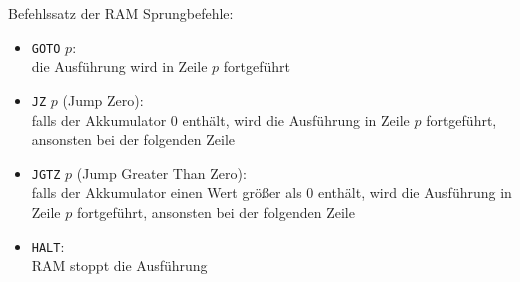 \documentclass[german]{../spicker}
\begin{document}
\begin{defi}{Befehlssatz der RAM}
  Sprungbefehle:
  \begin{itemize}
    \item \texttt{GOTO} $p$: \\
          die Ausführung wird in Zeile $p$ fortgeführt
    \item \texttt{JZ} $p$ (Jump Zero): \\
          falls der Akkumulator 0 enthält, wird die Ausführung in Zeile $p$ fortgeführt, ansonsten bei der folgenden Zeile
    \item \texttt{JGTZ} $p$ (Jump Greater Than Zero): \\
          falls der Akkumulator einen Wert größer als 0 enthält, wird die Ausführung in Zeile $p$ fortgeführt, ansonsten bei der folgenden Zeile
    \item \texttt{HALT}: \\
          RAM stoppt die Ausführung
  \end{itemize}
\end{defi}
\end{document}
